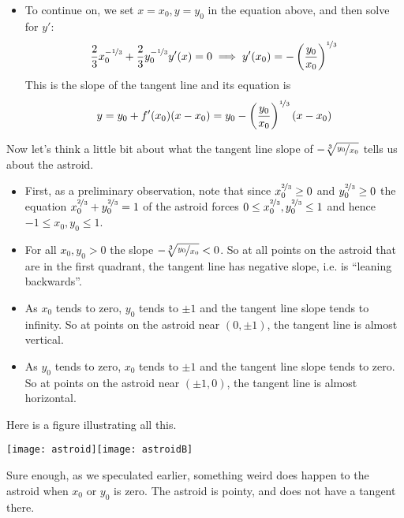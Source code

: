 \begin{eg}
\begin{itemize}
\item To continue on, we set $x=x_0, y=y_0$ in the equation above, and
then solve for $y'$:
\begin{equation*}
\frac{2}{3}x_0^{-\nicefrac{1}{3}}
+\frac{2}{3} y_0^{-\nicefrac{1}{3}} y'(x)=0
\implies y'(x_0)= -\left( \frac{y_0}{x_0} \right)^{\nicefrac{1}{3}}
\end{equation*}
This is the slope of the tangent line and its equation is
\begin{equation*}
y=y_0+f'(x_0)(x-x_0) = y_0
-\left(\frac{y_0}{x_0}\right)^{\nicefrac{1}{3}}(x-x_0)
\end{equation*}
\end{itemize}


Now let's think a little bit about what the tangent line slope of
$-\root{3}\of {\nicefrac{y_0}{x_0}}$ tells us about the astroid.
\begin{itemize}
 \item First, as a preliminary observation, note that since
$x_0^{\nicefrac{2}{3}}\ge0$ and $y_0^{\nicefrac{2}{3}}\ge0$ the equation
$x_0^{\nicefrac{2}{3}}+y_0^{\nicefrac{2}{3}}=1$ of the astroid forces
$0\le x_0^{\nicefrac{2}{3}},y_0^{\nicefrac{2}{3}} \le 1$ and
hence $-1\le x_0,y_0\le 1$.

\item For all $x_0,y_0>0$ the slope $-\root{3}\of {\nicefrac{y_0}{x_0}}
<0$. So at all points on the astroid that are in the first quadrant,
the tangent line has negative slope, i.e. is ``leaning backwards''.

\item  As $x_0$ tends to zero, $y_0$ tends to $\pm 1$ and the
tangent line slope tends to infinity. So at points on the astroid near
$(0,\pm 1)$, the tangent line is almost vertical.

\item As $y_0$ tends to zero, $x_0$ tends to $\pm 1$ and the
tangent line slope tends to zero. So at points on the astroid near
$(\pm 1,0)$, the tangent line is almost horizontal.
\end{itemize}
Here is a figure illustrating all this.
\begin{efig}
\begin{center}
   \texttt{[image: astroid]}\qquad\texttt{[image: astroidB]}
\end{center}
\end{efig}
Sure enough, as we speculated earlier, something weird does happen
to the astroid when $x_0$ or $y_0$ is zero. The astroid is pointy,
and does not have a tangent there.
\end{eg}



